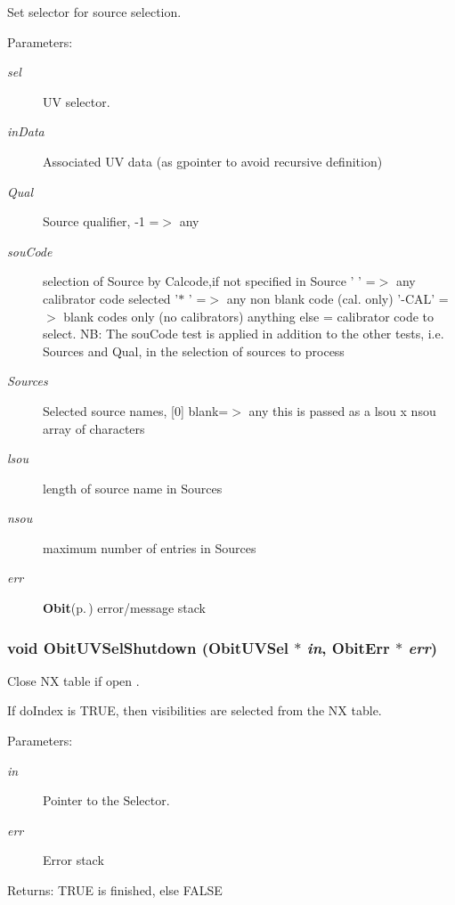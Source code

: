 Set selector for source selection. 

\begin{Desc}
\item[Parameters:]
\begin{description}
\item[{\em sel}]UV selector. \item[{\em in\-Data}]Associated UV data (as gpointer to avoid recursive definition) \item[{\em Qual}]Source qualifier, -1 =$>$ any \item[{\em sou\-Code}]selection of Source by Calcode,if not specified in Source ' ' =$>$ any calibrator code selected '$\ast$ ' =$>$ any non blank code (cal. only) '-CAL' =$>$ blank codes only (no calibrators) anything else = calibrator code to select. NB: The sou\-Code test is applied in addition to the other tests, i.e. Sources and Qual, in the selection of sources to process \item[{\em Sources}]Selected source names, [0] blank=$>$ any this is passed as a lsou x nsou array of characters \item[{\em lsou}]length of source name in Sources \item[{\em nsou}]maximum number of entries in Sources \item[{\em err}]{\bf Obit}{\rm (p.\,\pageref{structObit})} error/message stack \end{description}
\end{Desc}
\subsubsection{\setlength{\rightskip}{0pt plus 5cm}void Obit\-UVSel\-Shutdown ({\bf Obit\-UVSel} $\ast$ {\em in}, {\bf Obit\-Err} $\ast$ {\em err})}\label{ObitUVSel_8h_a13}


Close NX table if open . 

If do\-Index is TRUE, then visibilities are selected from the NX table. \begin{Desc}
\item[Parameters:]
\begin{description}
\item[{\em in}]Pointer to the Selector. \item[{\em err}]Error stack \end{description}
\end{Desc}
\begin{Desc}
\item[Returns:]TRUE is finished, else FALSE \end{Desc}
